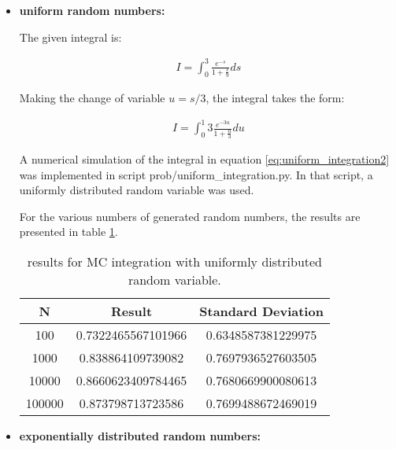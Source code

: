 \documentclass[paper=a4, fontsize=11pt]{scrartcl} %
\numberwithin{equation}{section} %
\numberwithin{figure}{section} %
\numberwithin{table}{section} %
\begin{document}
\begin{itemize}
\item \textbf{uniform random numbers:} 

The given integral is:


\begin{equation}
\begin{split}
I = \int_{0}^{3}\frac{e^{-s}}{1+\frac{s}{9}}ds
\end{split}
\label{eq:uniform_integration1}
\end{equation}

Making the change of variable $u = s/3$, the integral takes the form:

\begin{equation}
\begin{split}
I = \int_{0}^{1}3\frac{e^{-3u}}{1+\frac{u}{3}}du
\end{split}
\label{eq:uniform_integration2}
\end{equation}


A numerical simulation of the integral in equation \ref{eq:uniform_integration2} was implemented in script prob/uniform\_integration.py. In that script, a uniformly distributed random variable was used.

For the various numbers of generated random numbers, the results are presented in table \ref{tab:MC_integration_uniform}.



\begin{table}
\label{tab:MC_integration_uniform}
\caption{results for MC integration with uniformly distributed random variable.}
\begin{center}
\begin{tabular}{ | c | c | c | }
\hline
 \textbf{N} & \textbf{Result} & \textbf{Standard Deviation} \\ \hline
 100 & 0.7322465567101966 & 0.6348587381229975 \\ \hline
 1000 & 0.838864109739082 & 0.7697936527603505 \\  \hline
 10000 & 0.8660623409784465 & 0.7680669900080613  \\ \hline
 100000 & 0.873798713723586 & 0.7699488672469019  \\ \hline
\end{tabular}
\end{center}
\end{table}




\item \textbf{exponentially distributed random numbers:} 


\end{itemize}
\end{document}
